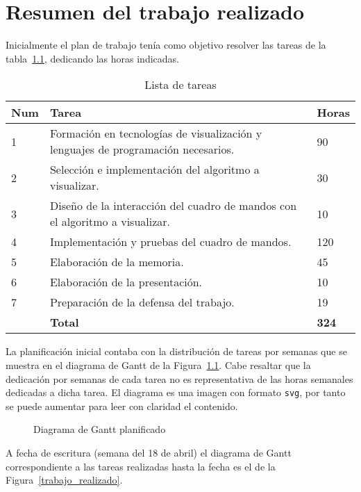 \chapter{Resumen del trabajo realizado}
\label{ch:trabajo_realizado}

Inicialmente el plan de trabajo tenía como objetivo resolver las tareas de la tabla~\ref{lista_tareas}, dedicando las horas indicadas.

\begin{table}[h]
\centering
\begin{tabular}{|p{1cm}|p{11cm}|p{1.1cm}|}
\hline
\textbf{Num} & \textbf{Tarea} & \textbf{Horas}\\
\hline\hline
1 & Formación en tecnologías de visualización y lenguajes de programación necesarios. & 90\\
\hline
2 & Selección e implementación del algoritmo a visualizar. & 30\\
\hline
3 & Diseño de la interacción del cuadro de mandos con el algoritmo a visualizar. & 10\\
\hline
4 & Implementación y pruebas del cuadro de mandos. & 120\\
\hline
5 & Elaboración de la memoria. & 45\\
\hline
6 & Elaboración de la presentación. & 10\\
\hline
7 & Preparación de la defensa del trabajo. & 19\\
\hline\hline
\textbf{} & \textbf{Total} & \textbf{324}\\
\hline
\end{tabular}
\caption{Lista de tareas}
\label{lista_tareas}
\end{table}

La planificación inicial contaba con la distribución de tareas por semanas que se muestra en el diagrama de Gantt de la Figura~\ref{plan_trabajo}. Cabe resaltar que la dedicación por semanas de cada tarea no es representativa de las horas semanales dedicadas a dicha tarea. El diagrama es una imagen con formato \texttt{svg}, por tanto se puede aumentar para leer con claridad el contenido.

\begin{figure}[h]
	{\fontsize{3}{4}\selectfont
		\centering
    	\def\svgscale{0.185}
    	
    	\caption{Diagrama de Gantt planificado}
    	\label{plan_trabajo}
	}
\end{figure}

\newpage

A fecha de escritura (semana del 18 de abril) el diagrama de Gantt correspondiente a las tareas realizadas hasta la fecha es el de la Figura~\ref{trabajo_realizado}.

